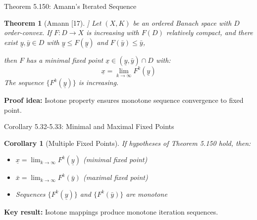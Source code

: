 \documentclass[aspectratio=169,10pt]{beamer}
\theoremstyle{plain}
\newtheorem*{theorem*}{Theorem}
\newtheorem*{corollary*}{Corollary}
\begin{document}
\begin{frame}{Theorem 5.150: Amann's Iterated Sequence}
  \begin{theorem*}[Amann [17]]
    Let $(X, K)$ be an ordered Banach space with $D$ order-convex. If
    $F: D \to X$ is increasing with $F(D)$ relatively compact, and
    there exist $\underline{y}, \bar{y} \in D$ with
    $\underline{y} \leq F(\underline{y})$ and $F(\bar{y}) \leq \bar{y}$,

    then $F$ has a minimal fixed point $\underline{x} \in (\underline{y}, \bar{y}) \cap D$ with:
    $$\underline{x} = \lim_{k \to \infty} F^k(\underline{y})$$
    The sequence $\{F^k(\underline{y})\}$ is increasing.
  \end{theorem*}

  \vspace{1em}

  \textbf{Proof idea:} Isotone property ensures monotone sequence convergence to fixed point.
\end{frame}

\begin{frame}{Corollary 5.32-5.33: Minimal and Maximal Fixed Points}
  \begin{corollary*}[Multiple Fixed Points]
    If hypotheses of Theorem 5.150 hold, then:
    \begin{itemize}
      \item $\underline{x} = \lim_{k \to \infty} F^k(\underline{y})$ (minimal fixed point)
      \item $\bar{x} = \lim_{k \to \infty} F^k(\bar{y})$ (maximal fixed point)
      \item Sequences $\{F^k(\underline{y})\}$ and $\{F^k(\bar{y})\}$ are monotone
    \end{itemize}
  \end{corollary*}

  \vspace{1em}

  \textbf{Key result:} Isotone mappings produce monotone iteration sequences.
\end{frame}
\end{document}
